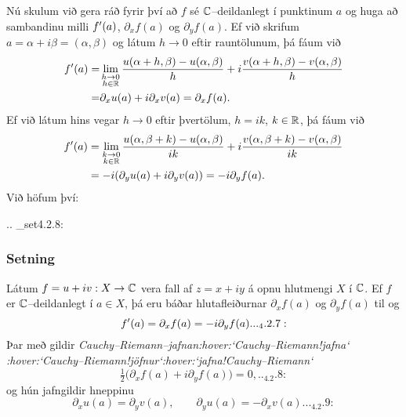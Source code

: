Nú skulum við gera ráð fyrir því að $f$ sé ${\mathbb C}$--deildanlegt í punktinum
$a$ og huga að sambandinu milli $f{\sp{\prime}}(a)$, ${\partial}_xf(a)$ og
${\partial}_yf(a)$. 
Ef við skrifum $a=\alpha+i\beta=(\alpha, \beta)$ og látum $h\to
0$ eftir  rauntölunum, þá fáum við 
\begin{align*}
f{\sp{\prime}}(a)=&\lim_{\substack{h\to 0\\ h\in {\mathbb R}}}
\dfrac{u(\alpha+h,\beta)-u(\alpha,\beta)}h+i
\dfrac{v(\alpha+h,\beta)-v(\alpha,\beta)}h\\
=&\partial_xu(a)+i\partial_xv(a)=\partial_xf(a).\nonumber
\end{align*}
Ef við látum hins vegar $h\to 0$ eftir þvertölum, $h=ik$,
$k\in {\mathbb R}$, þá fáum við
\begin{align*}
f{\sp{\prime}}(a)&=\lim_{\substack{k\to 0\\ k\in {\mathbb R}}}
\dfrac{u(\alpha,\beta+k)-u(\alpha,\beta)}{ik}+i
\dfrac{v(\alpha,\beta+k)-v(\alpha,\beta)}{ik}\\
&=-i(\partial_yu(a)+i\partial_yv(a))=-i\partial_yf(a).\nonumber
\end{align*}
Við höfum því:  


.. _set4.2.8:

\subsubsection{Setning}  Látum $f=u+iv:X\to {\mathbb C}$ vera fall af $z=x+iy$ á opnu hlutmengi
$X$ í ${\mathbb C}$.  Ef $f$ er ${\mathbb C}$--deildanlegt í $a\in X$, þá eru báðar
hlutafleiðurnar $\partial_xf(a)$ og $\partial_yf(a)$ til og
 \begin{equation*}f\dash(a)=\partial_xf(a)=-i\partial_yf(a).


.. _4.2.7:

 \end{equation*}
Þar með gildir {\it
Cauchy--Riemann--jafnan:hover:`Cauchy--Riemann!jafna`
:hover:`Cauchy--Riemann!jöfnur`:hover:`jafna!Cauchy--Riemann`}
\begin{equation}
\tfrac 12\big(\partial_xf(a)+i\partial_yf(a)\big)=0,


.. _4.2.8:

\end{equation}
og  hún jafngildir hneppinu
\begin{equation}\partial_xu(a)=\partial_yv(a), \qquad \partial_yu(a)=-\partial_xv(a).


.. _4.2.9:

\end{equation}



